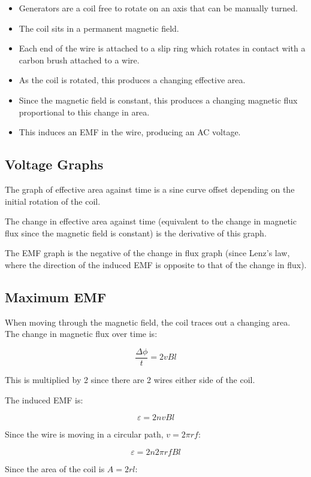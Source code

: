 \documentclass[a4paper,11pt]{article}
\begin{document}
\begin{itemize}
\item Generators are a coil free to rotate on an axis that can be manually
	turned.
\item The coil sits in a permanent magnetic field.
\item Each end of the wire is attached to a slip ring which rotates in contact
	with a carbon brush attached to a wire.
\item As the coil is rotated, this produces a changing effective area.
\item Since the magnetic field is constant, this produces a changing magnetic
	flux proportional to this change in area.
\item This induces an EMF in the wire, producing an AC voltage.
\end{itemize}


\subsection{Voltage Graphs}

The graph of effective area against time is a sine curve offset depending on
the initial rotation of the coil.

The change in effective area against time (equivalent to the change in magnetic
flux since the magnetic field is constant) is the derivative of this graph.

The EMF graph is the negative of the change in flux graph (since Lenz's law,
where the direction of the induced EMF is opposite to that of the change in
flux).


\subsection{Maximum EMF}

When moving through the magnetic field, the coil traces out a changing area.
The change in magnetic flux over time is:

$$
\frac{\Delta \phi}{t} = 2vBl
$$

This is multiplied by 2 since there are 2 wires either side of the coil.

The induced EMF is:

$$
\varepsilon = 2nvBl
$$

Since the wire is moving in a circular path, $v = 2\pi r f$:

$$
\varepsilon = 2n 2 \pi r f B l
$$

Since the area of the coil is $A = 2 r l$:
\end{document}
